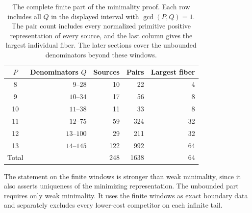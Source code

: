 \begin{table}[tb]
\centering
\caption{The complete finite part of the minimality proof. Each row includes
all $Q$ in the displayed interval with $\gcd(P,Q)=1$. The pair count includes
every normalized primitive positive representation of every source, and the
last column gives the largest individual fiber. The later sections cover the
unbounded denominators beyond these windows.}
\label{tab:gaussian-windows}
\small
\setlength{\tabcolsep}{11pt}
\renewcommand{\arraystretch}{1.12}
\begin{tabular}{@{}crrrr@{}}
\toprule
$P$ & Denominators $Q$ & Sources & Pairs & Largest fiber \\
\midrule
8 & $9$--$28$ & 10 & 22 & 4 \\
9 & $10$--$34$ & 17 & 56 & 8 \\
10 & $11$--$38$ & 11 & 33 & 8 \\
11 & $12$--$75$ & 59 & 324 & 32 \\
12 & $13$--$100$ & 29 & 211 & 32 \\
13 & $14$--$145$ & 122 & 992 & 64 \\
\midrule
Total & & 248 & 1638 & 64 \\
\bottomrule
\end{tabular}
\end{table}

The statement on the finite windows is stronger than weak minimality, since
it also asserts uniqueness of the minimizing representation. The unbounded
part requires only weak minimality. It uses the finite windows as exact
boundary data and separately excludes every lower-cost competitor on each
infinite tail.
